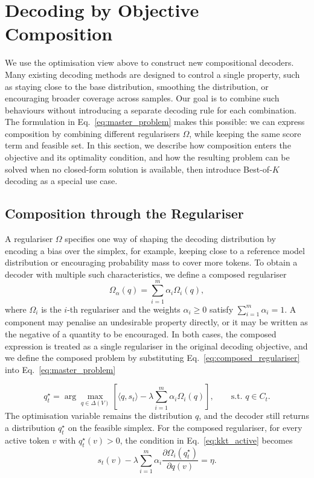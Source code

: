 \documentclass{article} %
\begin{document}
\section{Decoding by Objective Composition}
\label{sec:composition}

We use the optimisation view above to construct new compositional decoders. Many existing decoding methods are designed to control a single property, such as staying close to the base distribution, smoothing the distribution, or encouraging broader coverage across samples. Our goal is to combine such behaviours without introducing a separate decoding rule for each combination. The formulation in Eq.~\ref{eq:master_problem} makes this possible: we can express composition by combining different regularisers $\Omega$, while keeping the same score term and feasible set. In this section, we describe how composition enters the objective and its optimality condition, and how the resulting problem can be solved when no closed-form solution is available, then introduce Best-of-$K$ decoding as a special use case.

\subsection{Composition through the Regulariser}
\label{subsec:composition_regulariser}

A regulariser $\Omega$ specifies one way of shaping the decoding distribution by encoding a bias over the simplex, for example, keeping close to a reference model distribution or encouraging probability mass to cover more tokens. To obtain a decoder with multiple such characteristics, we define a composed regulariser
\begin{equation}
\Omega_\alpha(q)
=
\sum_{i=1}^{m}\alpha_i\Omega_i(q),
\label{eq:composed_regulariser}
\end{equation}
where $\Omega_i$ is the $i$-th regulariser and the weights $\alpha_i\geq 0$ satisfy $\sum_{i=1}^{m}\alpha_i=1$. 
A component may penalise an undesirable property directly, or it may be written as the negative of a quantity to be encouraged. In both cases, the composed expression is treated as a single regulariser in the original decoding objective, and we define the composed problem by substituting Eq.~\ref{eq:composed_regulariser} into Eq.~\ref{eq:master_problem}

\begin{equation}
q_t^\star
=
\arg\max_{q\in\Delta(V)}
\left[
\langle q,s_t\rangle
-
\lambda
\sum_{i=1}^{m}\alpha_i\Omega_i(q)
\right],
\qquad
\text{s.t. } q\in C_t .
\label{eq:expanded_composed_master_problem}
\end{equation}
The optimisation variable remains the distribution $q$, and the decoder still returns a distribution $q_t^\star$ on the feasible simplex. For the composed regulariser, for every active token $v$ with $q^{\star}_t(v) > 0$, the condition in Eq.~\ref{eq:kkt_active} becomes
\begin{equation}
s_t(v)
-
\lambda
\sum_{i=1}^{m}
\alpha_i
\frac{\partial \Omega_i(q_t^\star)}{\partial q(v)}
=
\eta.
\label{eq:composed_kkt_active}
\end{equation}
\end{document}
